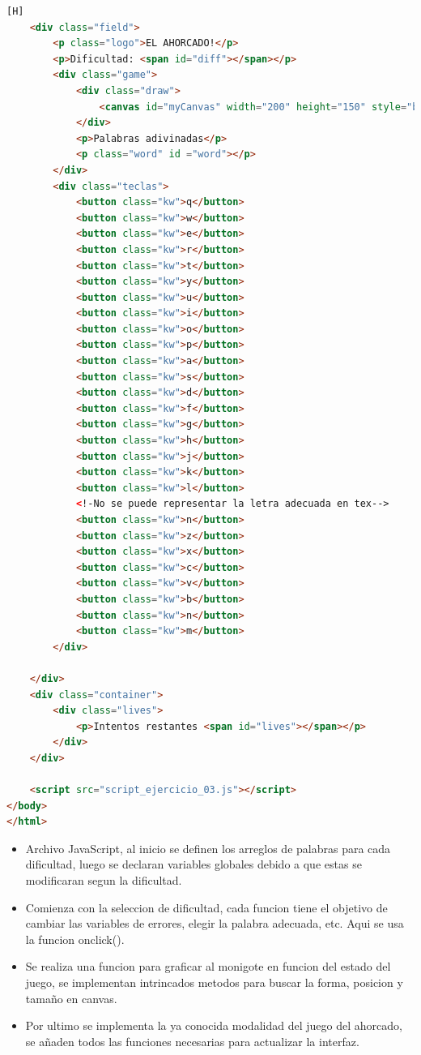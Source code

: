 \documentclass{article}
\begin{document}
\begin{lstlisting}[language=html,caption={Ejercicio3/index.html}][H]
    <div class="field">
        <p class="logo">EL AHORCADO!</p>
        <p>Dificultad: <span id="diff"></span></p>
        <div class="game">
            <div class="draw">
                <canvas id="myCanvas" width="200" height="150" style="border:1px solid #000000;">
            </div>
            <p>Palabras adivinadas</p>
            <p class="word" id ="word"></p>
        </div>
        <div class="teclas">
            <button class="kw">q</button>
            <button class="kw">w</button>
            <button class="kw">e</button>
            <button class="kw">r</button>
            <button class="kw">t</button>
            <button class="kw">y</button>
            <button class="kw">u</button>
            <button class="kw">i</button>
            <button class="kw">o</button>
            <button class="kw">p</button>
            <button class="kw">a</button>
            <button class="kw">s</button>
            <button class="kw">d</button>
            <button class="kw">f</button>
            <button class="kw">g</button>
            <button class="kw">h</button>
            <button class="kw">j</button>
            <button class="kw">k</button>
            <button class="kw">l</button>
            <!-No se puede representar la letra adecuada en tex-->
            <button class="kw">n</button>
            <button class="kw">z</button>
            <button class="kw">x</button>
            <button class="kw">c</button>
            <button class="kw">v</button>
            <button class="kw">b</button>
            <button class="kw">n</button>
            <button class="kw">m</button>
        </div>
        
    </div>
    <div class="container">
        <div class="lives">
            <p>Intentos restantes <span id="lives"></span></p>
        </div>
    </div>
    
    <script src="script_ejercicio_03.js"></script>
</body>
</html>
	\end{lstlisting}
\begin{itemize}	
		\item Archivo JavaScript, al inicio se definen los arreglos de palabras para cada dificultad, luego se declaran variables globales debido a que estas se modificaran segun la dificultad.
		\item Comienza con la seleccion de dificultad, cada funcion tiene el objetivo de cambiar las variables de errores, elegir la palabra adecuada, etc. Aqui se usa la funcion onclick().
		\item Se realiza una funcion para graficar al monigote en funcion del estado del juego, se implementan intrincados metodos para buscar la forma, posicion y tamaño en canvas.
		\item Por ultimo se implementa la ya conocida modalidad del juego del ahorcado, se añaden todos las funciones necesarias para actualizar la interfaz.
		
	\end{itemize}	
		
\end{document}
